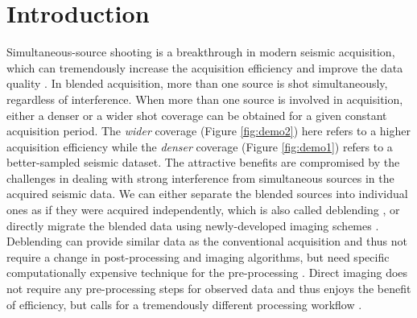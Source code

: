 \section{Introduction}
Simultaneous-source shooting is a breakthrough in modern seismic acquisition, which can tremendously increase the acquisition efficiency and improve the data quality \cite[]{beasleycj1998,berkhout2008,abma2009}. In blended acquisition, more than one source is shot simultaneously, regardless of  interference. When more than one source is involved in acquisition, either a denser or a wider shot coverage can be obtained for a given constant acquisition period. The
\emph{wider} coverage (Figure \ref{fig:demo2}) here refers to a higher acquisition efficiency while the \emph{denser} coverage (Figure \ref{fig:demo1}) refers to a better-sampled seismic dataset. The attractive benefits are compromised by the challenges in dealing with strong interference from simultaneous sources in the acquired seismic data. We can either separate the blended sources into individual ones as if they were acquired independently, which is also called deblending
\cite[]{yangkang2014svmf,shuwei2016}, or directly migrate the blended data using  newly-developed imaging schemes \cite[]{verschuur2011,yaxun2009}. Deblending can provide similar data as the conventional acquisition and thus not require a change in post-processing and imaging algorithms, but need specific computationally expensive technique for the pre-processing \cite[]{abma2009,abma2014}. Direct imaging does not require any pre-processing steps for observed data and thus enjoys the benefit of  efficiency, but calls for a tremendously different processing workflow \cite[]{zhiguang2014,yangkang2015image}. 

